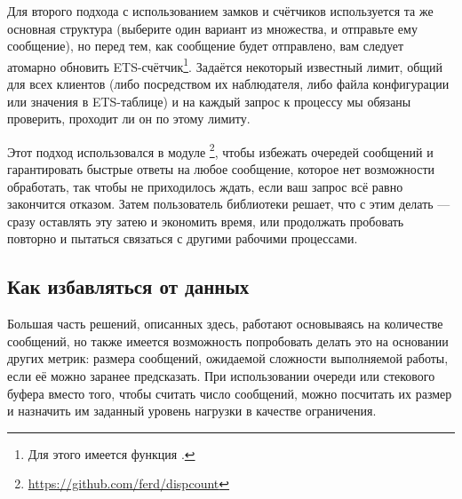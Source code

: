 Для второго подхода с использованием замков и счётчиков используется та же основная структура (выберите один вариант из множества, и отправьте ему сообщение), но перед тем, как сообщение будет отправлено, вам следует атомарно обновить ETS-счётчик\footnote{Для этого имеется функция .}. Задаётся некоторый известный лимит, общий для всех клиентов (либо посредством их наблюдателя, либо файла конфигурации или значения в ETS-таблице) и на каждый запрос к процессу мы обязаны проверить, проходит ли он по этому лимиту.

Этот подход использовался в модуле \footnote{\href{https://github.com/ferd/dispcount}{https://github.com/ferd/dispcount}}, чтобы избежать очередей сообщений и гарантировать быстрые ответы на любое сообщение, которое нет возможности обработать, так чтобы не приходилось ждать, если ваш запрос всё равно закончится отказом. Затем пользователь библиотеки решает, что с этим делать --- сразу оставлять эту затею и экономить время, или продолжать пробовать повторно и пытаться связаться с другими рабочими процессами.


\subsection{Как избавляться от данных}

Большая часть решений, описанных здесь, работают основываясь на количестве сообщений, но также имеется возможность попробовать делать это на основании других метрик: размера сообщений, ожидаемой сложности выполняемой работы, если её можно заранее предсказать. При использовании очереди или стекового буфера вместо того, чтобы считать число сообщений, можно посчитать их размер и назначить им заданный уровень нагрузки в качестве ограничения.

